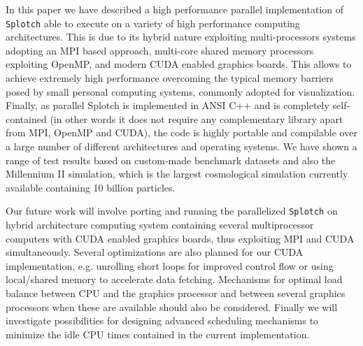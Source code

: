 
In this paper we have described a high performance parallel implementation of {\tt Splotch} 
able to execute on a variety of high performance computing architectures. This is due 
to its hybrid nature exploiting multi-processors systems adopting an MPI based approach, 
multi-core shared memory processors exploiting OpenMP, and modern CUDA enabled graphics 
boards. This allows to achieve extremely high performance overcoming the typical memory 
barriers posed by small personal computing systems, commonly adopted for visualization. 
Finally, as parallel Splotch is implemented in ANSI C++ and is completely self-contained 
(in other words it does not require any complementary library apart from MPI, OpenMP and CUDA), 
the code is highly portable and compilable over a large number of different 
architectures and operating systems. We have shown a range of test results based on 
custom-made benchmark datasets and also the Millennium II simulation, which is the 
largest cosmological simulation currently available containing 10 billion particles.

Our future work will involve porting and running the parallelized {\tt Splotch} on hybrid 
architecture computing system containing several multiprocessor computers with CUDA 
enabled graphics boards, thus exploiting MPI and CUDA simultaneously. 
Several optimizations are also planned for our CUDA implementation, e.g. unrolling 
short loops for improved control flow or using local/shared memory to accelerate data fetching. 
Mechanisms for optimal load balance between CPU and the graphics processor and between several 
graphics processors when these are available should also be considered. Finally we will 
investigate possibilities for designing advanced scheduling mechanisms to minimize 
the idle CPU times contained in the current implementation.

